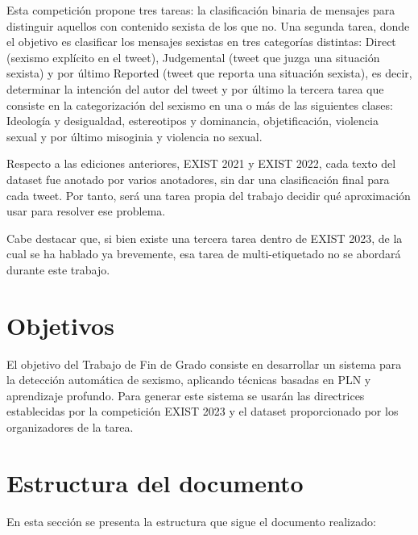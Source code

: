 Esta competición propone tres tareas: la clasificación binaria de mensajes para distinguir aquellos con contenido sexista de los que no. Una segunda tarea, donde el objetivo es clasificar los mensajes sexistas en tres categorías distintas:  Direct (sexismo explícito en el tweet), Judgemental (tweet que juzga una situación sexista) y por último Reported (tweet que reporta una situación sexista), es decir, determinar la intención del autor del tweet y por último la tercera tarea que consiste en la categorización del sexismo en una o más de las siguientes clases: Ideología y desigualdad, estereotipos y dominancia, objetificación, violencia sexual y por último misoginia y violencia no sexual.

Respecto a las ediciones anteriores, EXIST 2021 y EXIST 2022, cada texto del dataset fue anotado por varios anotadores, sin dar una clasificación final para cada tweet. Por tanto, será una tarea propia del trabajo decidir qué aproximación usar para resolver ese problema.
        
Cabe destacar que, si bien existe una tercera tarea dentro de EXIST 2023, de la cual se ha hablado ya brevemente, esa tarea de multi-etiquetado no se abordará durante este trabajo.

\section{Objetivos}

El objetivo del Trabajo de Fin de Grado consiste en desarrollar un sistema para la detección automática de sexismo, aplicando técnicas basadas en PLN y aprendizaje profundo. Para generar este sistema se usarán las directrices establecidas por la competición EXIST 2023 \cite{EXIST2023} y el dataset proporcionado por los organizadores de la tarea. 

\section{Estructura del documento}
En esta sección se presenta la estructura que sigue el documento realizado:

